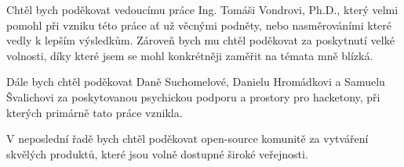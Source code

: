 \documentclass[czech,bachelor,unicode]{ctufit-thesis}
\begin{document}
 
\frontmatter\frontmatterinit %


\thispagestyle{empty}\cleardoublepage\maketitle %

\imprintpage %

\tableofcontents %
\listoffigures %
\begingroup
\let\clearpage\relax
\lstlistoflistings %
\endgroup

\begin{acknowledgmentpage}
	Chtěl bych poděkovat vedoucímu práce Ing. Tomáši Vondrovi, Ph.D., který velmi pomohl při vzniku této práce ať už věcnými podněty, nebo nasměrováními které vedly k lepším výsledkům. Zároveň bych mu chtěl poděkovat za poskytnutí velké volnosti, díky které jsem se mohl konkrétněji zaměřit na témata mně blízká.
 
    Dále bych chtěl poděkovat Daně Suchomelové, Danielu Hromádkovi a Samuelu Švalichovi za poskytovanou psychickou podporu a prostory pro hacketony, při kterých primárně tato práce vznikla.
 
    V neposlední řadě bych chtěl poděkovat open-source komunitě za vytváření skvělých produktů, které jsou volně dostupné široké veřejnosti. 
\end{acknowledgmentpage} 
\end{document}
